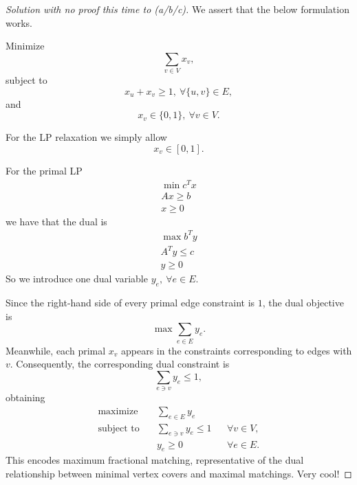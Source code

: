 \documentclass[11pt]{article}
\begin{document}
\begin{proof}[Solution with no proof this time to (a/b/c)]
    We assert that the below formulation works. 

    Minimize 
    \[
        \sum_{v \in V} x_v,
    \]
    subject to 
    \[
        x_u + x_v \geq 1, \ \forall \{u,v\} \in E, 
    \]
    and 
    \[
        x_v \in \{0,1\}, \ \forall v \in V. 
    \]

    For the LP relaxation we simply allow 
    \[
        x_v \in [0,1]. 
    \]    

    For the primal LP 
    \[
        \begin{aligned}
            \min c^T x \\ 
            Ax \geq b \\ 
            x \geq 0 
        \end{aligned}
    \]
    we have that the dual is 
    \[
        \begin{aligned}
        \max b^Ty \\ 
        A^Ty \leq c \\ 
        y \geq 0
        \end{aligned}
    \]
    So we introduce one dual variable 
    $y_e, \ \forall e \in E$. 

    Since the right-hand side of every primal edge 
    constraint is $1$, the dual objective is 
    \[
        \max \sum_{e \in E} y_e. 
    \]
    Meanwhile, each primal $x_v$ appears in 
    the constraints corresponding to edges 
    with $v$. 
    Consequently, the corresponding dual 
    constraint is 
    \[
        \sum_{e\ni v} y_e \leq 1, 
    \]
    obtaining 
    \[
        \begin{aligned}
        \text{maximize}\quad
        &\sum_{e\in E}y_e\\
        \text{subject to}\quad
        &\sum_{e\ni v}y_e\leq1
        &&\forall v\in V,\\
        &y_e\geq0
        &&\forall e\in E.
        \end{aligned}
    \]
    This encodes maximum fractional matching, representative 
    of the dual relationship between minimal vertex 
    covers and maximal matchings. Very cool!
\end{proof}
\end{document}
